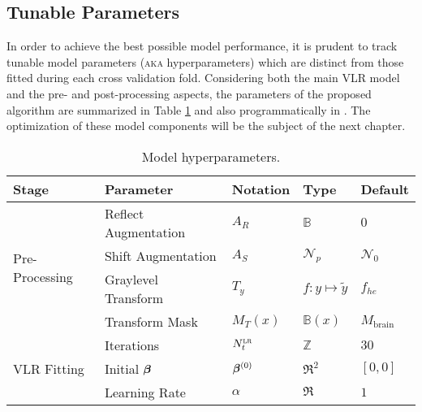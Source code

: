 \subsection{Tunable Parameters}
In order to achieve the best possible model performance, it is prudent to track tunable model parameters (\textsc{aka} hyperparameters) which are distinct from those fitted during each cross validation fold.
Considering both the main VLR model and the pre- and post-processing aspects, the parameters of the proposed algorithm are summarized in Table \ref{tab:hyperparams} and also programmatically in .
The optimization of these model components will be the subject of the next chapter.
\begin{table}
  \centering
  \caption{Model hyperparameters.}
  \label{tab:hyperparams}
  \begin{tabular}{lllll}
  	\hline
  	Stage                            & Parameter            & Notation                    & Type                                              & Default                   \\ \hline
  	\multirow{4}{*}{Pre-Processing}  & Reflect Augmentation & $A_R$                       & $\mathbb{B}$                                      & $0$                       \\
  	                                 & Shift Augmentation   & $A_S$                       & $\mathcal{N}_p$                                   & $\mathcal{N}_0$           \\
  	                                 & Graylevel Transform  & $T_y$                       & $f: y\mapsto \tilde{y}$                           & $f_{he}$                  \\
  	                                 & Transform Mask       & $M_{T}(x)$                  & $\mathbb{B}(x)$                                   & $M_{\text{brain}}$        \\ \hline
  	\multirow{6}{*}{VLR Fitting}     & Iterations           & $N_{t}^{\textsc{lr}}$               & $\mathbb{Z}$                                      & $30$                      \\
  	                                 & Initial $\bm{\beta}$        & $\bm{\beta}^{(0)}$                 & $\Re^2$                                           & $[0,0]$                   \\
  	                                 & Learning Rate        & $\alpha$                    & $\Re$                                             & $1$                       \\

\end{tabular}
\end{table}
